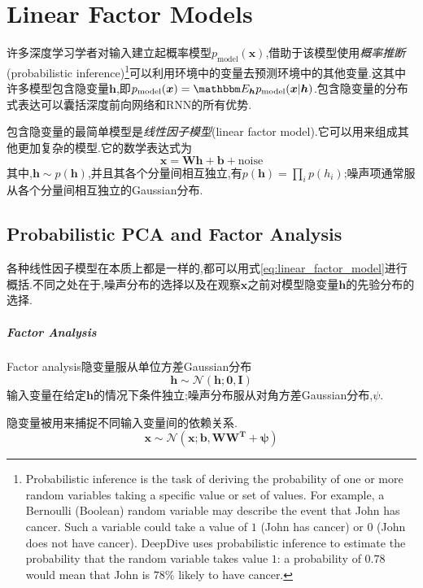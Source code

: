 \chapter{Linear Factor Models}

许多深度学习学者对输入建立起概率模型$p_{\text{model}}(\bm x)$,借助于该模型使用\textit{概率推断}(probabilistic inference)\footnote{Probabilistic inference is the task of deriving the probability of one or more random variables taking a specific value or set of values. For example, a Bernoulli (Boolean) random variable may describe the event that John has cancer. Such a variable could take a value of $1$ (John has cancer) or $0$ (John does not have cancer). DeepDive uses probabilistic inference to estimate the probability that the random variable takes value $1$: a probability of $0.78$ would mean that John is $78\%$ likely to have cancer.}可以利用环境中的变量去预测环境中的其他变量.这其中许多模型包含隐变量$\bm h$,即$p_{\text{model}}(\bm x)=\mathbbm E_{\bm h}p_{\text{model}}(\bm x|\bm h)$.包含隐变量的分布式表达可以囊括深度前向网络和RNN的所有优势.

包含隐变量的最简单模型是\textit{线性因子模型}(linear factor model).它可以用来组成其他更加复杂的模型.它的数学表达式为
\begin{equation}\label{eq:linear_factor_model}
\bm x=\bm {Wh+b}+\text{noise}
\end{equation}
其中,$\bm h\sim p(\bm h)$,并且其各个分量间相互独立,有$p(\bm h)=\prod_ip(h_i)$;噪声项通常服从各个分量间相互独立的Gaussian分布.

\section{Probabilistic PCA and Factor Analysis}

各种线性因子模型在本质上都是一样的,都可以用式\ref{eq:linear_factor_model}进行概括.不同之处在于,噪声分布的选择以及在观察$\bm x$之前对模型隐变量$\bm h$的先验分布的选择.

\paragraph{Factor Analysis}

Factor analysis隐变量服从单位方差Gaussian分布
\begin{equation}
\bm h\sim\mathcal N(\bm{h;0,I})
\end{equation}
输入变量在给定$\bm h$的情况下条件独立;噪声分布服从对角方差Gaussian分布,$\psi$.

隐变量被用来捕捉不同输入变量间的依赖关系.
\begin{equation}
\bm x\sim\mathcal N(\bm{x;b,WW^T+\psi})
\end{equation}


